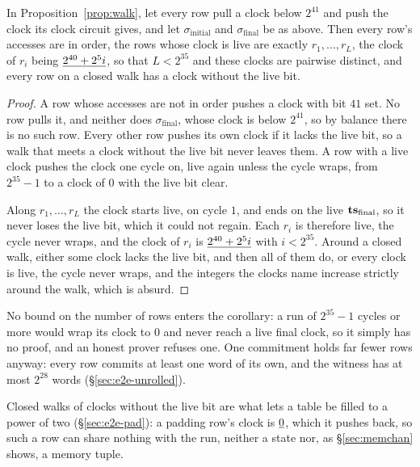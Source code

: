 \begin{corollary}\label{cor:clock}
In Proposition~\ref{prop:walk}, let every row pull a clock below $2^{41}$ and push the clock its clock circuit gives, and let $\sigma_{\mathrm{initial}}$ and $\sigma_{\mathrm{final}}$ be as above. Then every row's accesses are in order, the rows whose clock is live are exactly $r_1,\dots,r_L$, the clock of $r_i$ being $\underline{2^{40}+2^{5}i}$, so that $L<2^{35}$ and these clocks are pairwise distinct, and every row on a closed walk has a clock without the live bit.
\end{corollary}

\begin{proof}
A row whose accesses are not in order pushes a clock with bit $41$ set. No row pulls it, and neither does $\sigma_{\mathrm{final}}$, whose clock is below $2^{41}$, so by balance there is no such row. Every other row pushes its own clock if it lacks the live bit, so a walk that meets a clock without the live bit never leaves them. A row with a live clock pushes the clock one cycle on, live again unless the cycle wraps, from $2^{35}-1$ to a clock of $0$ with the live bit clear.

Along $r_1,\dots,r_L$ the clock starts live, on cycle $1$, and ends on the live $\mathbf{ts}_{\mathrm{final}}$, so it never loses the live bit, which it could not regain. Each $r_i$ is therefore live, the cycle never wraps, and the clock of $r_i$ is $\underline{2^{40}+2^{5}i}$ with $i<2^{35}$. Around a closed walk, either some clock lacks the live bit, and then all of them do, or every clock is live, the cycle never wraps, and the integers the clocks name increase strictly around the walk, which is absurd.
\end{proof}

No bound on the number of rows enters the corollary: a run of $2^{35}-1$ cycles or more would wrap its clock to $0$ and never reach a live final clock, so it simply has no proof, and an honest prover refuses one. One commitment holds far fewer rows anyway: every row commits at least one word of its own, and the witness has at most $2^{28}$ words (\S\ref{sec:e2e-unrolled}).

\begin{remark}
  Closed walks of clocks without the live bit are what lets a table be filled to a power of two (\S\ref{sec:e2e-pad}): a padding row's clock is $\underline{0}$, which it pushes back, so such a row can share nothing with the run, neither a state nor, as \S\ref{sec:memchan} shows, a memory tuple.
\end{remark}

